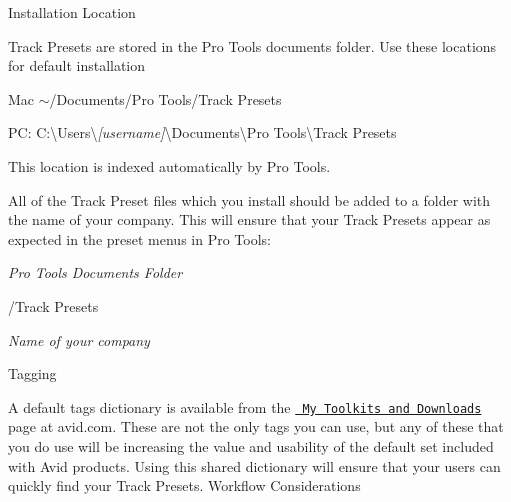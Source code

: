   Installation Location

 Track Presets are stored in the Pro Tools documents folder. Use these locations for default installation

 
\begin{DoxyItemize}
\item Mac $\sim$/\+Documents/\+Pro Tools/\+Track Presets  
\item PC\+: C\+:\textbackslash{}Users\textbackslash{}{\itshape \mbox{[}username\mbox{]}}\textbackslash{}Documents\textbackslash{}Pro Tools\textbackslash{}Track Presets  
\end{DoxyItemize}

 This location is indexed automatically by Pro Tools.

 All of the Track Preset files which you install should be added to a folder with the name of your company. This will ensure that your Track Presets appear as expected in the preset menus in Pro Tools\+:

 
\begin{DoxyItemize}
\item {\itshape Pro Tools Documents Folder} 
\begin{DoxyItemize}
\item /\+Track Presets 
\begin{DoxyItemize}
\item 
\begin{DoxyItemize}
\item {\itshape Name of your company}  
\end{DoxyItemize}
\end{DoxyItemize}
\end{DoxyItemize}
\end{DoxyItemize}

  Tagging

 A default tags dictionary is available from the \href{https://my.avid.com/products/cppsdk}{\texttt{ My Toolkits and Downloads}} page at avid.\+com. These are not the only tags you can use, but any of these that you do use will be increasing the value and usability of the default set included with Avid products. Using this shared dictionary will ensure that your users can quickly find your Track Presets.  Workflow Considerations


